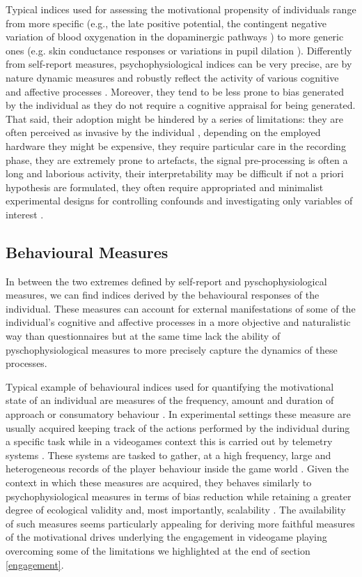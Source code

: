 Typical indices used for assessing the motivational propensity of individuals range from more specific (e.g., the late positive potential, the contingent negative variation of blood oxygenation in the dopaminergic pathways \cite{cacioppo2007handbook}) to more generic ones (e.g. skin conductance responses or variations in pupil dilation \cite{cacioppo2007handbook}). Differently from self-report measures, psychophysiological indices can be very precise, are by nature dynamic measures and robustly reflect the activity of various cognitive and affective processes \cite{cacioppo2007handbook}. Moreover, they tend to be less prone to bias generated by the individual as they do not require a cognitive appraisal for being generated. That said, their adoption might be hindered by a series of limitations: they are often perceived as invasive by the individual \cite{yannakakis2013player}, depending on the employed hardware they might be expensive, they require particular care in the recording phase, they are extremely prone to artefacts, the signal pre-processing is often a long and laborious activity, their interpretability may be difficult if not a priori hypothesis are formulated, they often require appropriated and minimalist experimental designs for controlling confounds and investigating only variables of interest \cite{liu2017toward}.
    
\subsection{Behavioural Measures}
\label{behavioural_indices}
In between the two extremes defined by self-report and pyschophysiological measures, we can find indices derived by the behavioural responses of the individual. These measures can account for external manifestations of some of the individual's cognitive and affective processes in a more objective and naturalistic way than questionnaires but at the same time lack the ability of pyschophysiological measures to more precisely capture the dynamics of these processes. 

Typical example of behavioural indices used for quantifying the motivational state of an individual are measures of the frequency, amount and duration of approach or consumatory behaviour \cite{berridge2004motivation, simpson2016behavioral}. In experimental settings these measure are usually acquired keeping track of the actions performed by the individual during a specific task \cite{berridge2009dissecting, simpson2016behavioral} while in a videogames context this is carried out by telemetry systems \cite{el2016game}. These systems are tasked to gather, at a high frequency,  large and heterogeneous records of the player behaviour inside the game world \cite{el2016game}. Given the context in which these measures are acquired, they behaves similarly to psychophysiological measures in terms of bias reduction while retaining a greater degree of ecological validity and, most importantly, scalability \cite{el2016game}. The availability of such measures seems particularly appealing for deriving more faithful measures of the motivational drives underlying the engagement in videogame playing overcoming some of the limitations we highlighted at the end of section \ref{engagement}.
    
